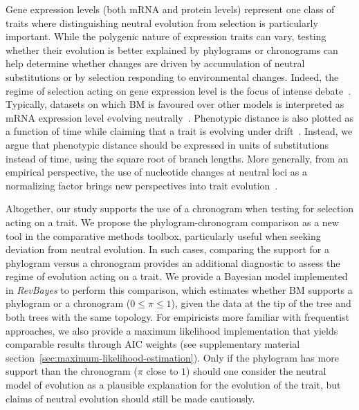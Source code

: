 \documentclass{article}
\newcommand{\PhyloSupport}{\pi}
\begin{document}
Gene expression levels (both mRNA and protein levels) represent one class of traits where distinguishing neutral evolution from selection is particularly important.
While the polygenic nature of expression traits can vary, testing whether their evolution is better explained by phylograms or chronograms can help determine whether changes are driven by accumulation of neutral substitutions or by selection responding to environmental changes.
Indeed, the regime of selection acting on gene expression level is the focus of intense debate~\citep{signor_evolution_2018, price_detecting_2022, bertram_cagee_2023, dimayacyac_evaluating_2023}.
Typically, datasets on which BM is favoured over other models is interpreted as mRNA expression level evolving neutrally~\citep{khaitovich_evolution_2006, catalan_drift_2019, dimayacyac_evaluating_2023}.
Phenotypic distance is also plotted as a function of time while claiming that a trait is evolving under drift~\citep{jiang_decoupling_2023}.
Instead, we argue that phenotypic distance should be expressed in units of substitutions instead of time, using the square root of branch lengths.
More generally, from an empirical perspective, the use of nucleotide changes at neutral loci as a normalizing factor brings new perspectives into trait evolution~\citep{latrille_detecting_2024}.

Altogether, our study supports the use of a chronogram when testing for selection acting on a trait.
We propose the phylogram-chronogram comparison as a new tool in the comparative methods toolbox, particularly useful when seeking deviation from neutral evolution.
In such cases, comparing the support for a phylogram versus a chronogram provides an additional diagnostic to assess the regime of evolution acting on a trait.
We provide a Bayesian model implemented in \textit{RevBayes} to perform this comparison, which estimates whether BM supports a phylogram or a chronogram ($0 \leq \PhyloSupport \leq 1$), given the data at the tip of the tree and both trees with the same topology.
For empiricists more familiar with frequentist approaches, we also provide a maximum likelihood implementation that yields comparable results through AIC weights (see supplementary material section~\ref{sec:maximum-likelihood-estimation}).
Only if the phylogram has more support than the chronogram ($\PhyloSupport$ close to $1$) should one consider the neutral model of evolution as a plausible explanation for the evolution of the trait, but claims of neutral evolution should still be made cautiously.
\end{document}
